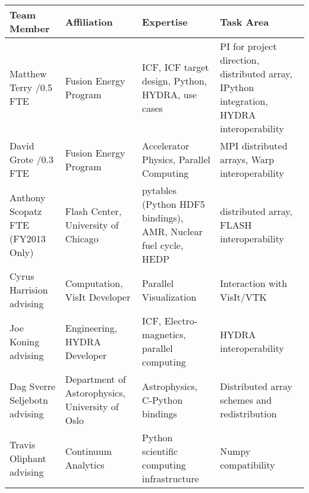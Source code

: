 \documentclass[letterpaper,11pt]{article}
\newlength{\DUtablewidth} %
\begin{document}
\setlength{\DUtablewidth}{\linewidth}
\begin{longtable*}[c]
	{|p{0.187\DUtablewidth}|p{0.251\DUtablewidth}|p{0.260\DUtablewidth}|p{0.251\DUtablewidth}|}
	\hline
	\textbf{Team Member} & \textbf{Affiliation} & \textbf{Expertise} & \textbf{Task Area} \\
	\endfirsthead
	\hline

	Matthew Terry /0.5 FTE &
	Fusion Energy Program &
	ICF, ICF target design, Python, HYDRA, use cases &
	PI for project direction, distributed array, IPython integration, HYDRA interoperability \\
	\hline

	David Grote /0.3 FTE &
	Fusion Energy Program &
	Accelerator Physics, Parallel Computing &
	MPI distributed arrays, Warp interoperability \\
	\hline

	Anthony Scopatz  FTE (FY2013 Only) &
	Flash Center, \newline
	University of Chicago &
	pytables (Python HDF5 bindings), AMR, Nuclear fuel cycle, HEDP &
	distributed array, FLASH interoperability \\
	\hline

	Cyrus Harrision \newline
	advising &
	Computation, VisIt Developer &
	Parallel Visualization &
	Interaction with VisIt/VTK  \\
	\hline

	Joe Koning \newline
	advising &
	Engineering, \newline
	HYDRA Developer & 
	ICF, Electro-magnetics, parallel computing & 
	HYDRA interoperability \\
	\hline

	Dag Sverre Seljebotn \newline
	advising &
	Department of Astorophysics, \newline
	University of Oslo &
	Astrophysics, C-Python bindings &
	Distributed array schemes and redistribution \\
	\hline

	Travis Oliphant \newline
	advising &
	Continuum Analytics &
	Python scientific computing infrastructure &
	Numpy compatibility \\
	\hline
\end{longtable*}



\end{document}
